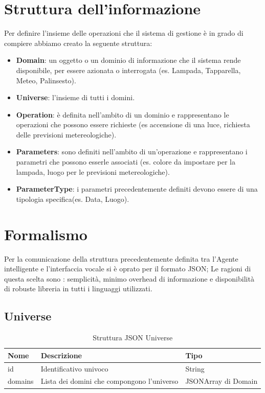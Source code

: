 \documentclass[twoside]{supsistudent}
\begin{document}
\section{Struttura dell'informazione}
Per definire l'insieme delle operazioni che il sistema di gestione è in grado di compiere abbiamo creato la seguente struttura:
\begin{itemize}
	\item \textbf{Domain}: un oggetto o un dominio di informazione che il sistema rende disponibile, per essere azionata o interrogata (es. Lampada, Tapparella, Meteo, Palinsesto).
	\item \textbf{Universe}: l'insieme di tutti i domini.
	\item \textbf{Operation}: è definita nell'ambito di un dominio e rappresentano le operazioni che possono essere richieste (es accensione di una luce, richiesta delle previsioni metereologiche).
	\item \textbf{Parameters}: sono definiti nell'ambito di un'operazione e rappresentano i parametri che possono esserle associati (es. colore da impostare per la lampada, luogo per le previsioni metereologiche).
	\item \textbf{ParameterType}: i parametri precedentemente definiti devono essere di una tipologia specifica(es. Data, Luogo).
\end{itemize}
\section{Formalismo}
Per la comunicazione della struttura precedentemente definita tra l'Agente intelligente e l'interfaccia vocale si è oprato per il formato JSON; Le ragioni di questa scelta sono : semplicità,  minimo overhead di informazione e  disponibilità di robuste libreria in tutti i linguaggi utilizzati.

\subsection{Universe}
\begin{table}[H]
\centering
\caption{Struttura JSON Universe}
\label{Struttura JSON Universe}
\begin{tabular}{@{}|l|l|l|@{}}
\toprule
Nome    & Descrizione                                & Tipo                \\ \midrule
id      & Identificativo univoco                     & String             \\ \midrule
domains & Lista dei domini che compongono l'universo & JSONArray di Domain \\ \bottomrule
\end{tabular}
\end{table}
\end{document}
